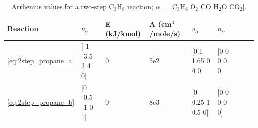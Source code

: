 \documentclass[11pt]{book}
\begin{document}
\begin{table}[ht]
\begin{center}
\caption[Arrhenius values for a two-step C$_3$H$_8$ reaction]{Arrhenius values for a two-step C$_3$H$_8$ reaction; $\alpha$ = [$\mathrm{C_3H_8}$ $\mathrm{O_2}$ $\mathrm{CO}$ $\mathrm{H_2O}$ $\mathrm{CO_2}$].}
\label{two_step_c3h8}
\begin{tabular}{|l|l|l|l|l|l|l|l|l|}
\hline Reaction & $\nu_{\alpha}$ & E (kJ/kmol) & A (cm$^3$/mole/s) & $a_{\alpha}$ & $n_{\alpha}$  \\ \hline \hline
\ref{eq:2step_propane_a} & [-1 -3.5 3 4 0] & 0 & 5e2 & [0.1 1.65 0 0 0] & [0 0 0 0 0] \\ \hline
\ref{eq:2step_propane_b} & [0 -0.5 -1 0 1] & 0 & 8e3 & [0 0.25 1 0.5 0] & [0 0 0 0 0] \\ \hline
\end{tabular}
\end{center}
\end{table}
\end{document}
